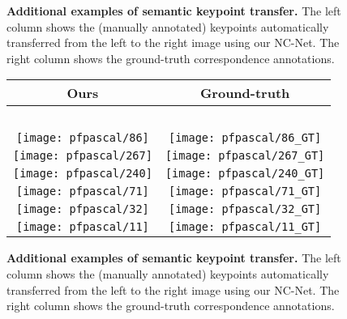\documentclass{article}
\begin{document}
\begin{figure}[tbp]
\begin{tabular}{@{\hskip 1pt}c@{\hskip 6pt}|@{\hskip 6pt}c@{\hskip 1pt}}
  \end{tabular}
  \endgroup
  \vspace{2pt}
  \caption{{\bf Additional examples of semantic  keypoint  transfer.} The left column shows the (manually annotated) keypoints automatically transferred from the left to the right image using our NC-Net. The right column shows the ground-truth correspondence annotations.}
  \label{fig:qualPascal}
\end{figure}\begin{figure}[tbp]
  \centering
  \begingroup
  \renewcommand{\arraystretch}{0.5}
  \begin{tabular}{@{\hskip 1pt}c@{\hskip 6pt}|@{\hskip 6pt}c@{\hskip 1pt}}
    Ours & Ground-truth \\ \hline
    ~ & ~ \\
\texttt{[image: pfpascal/86]}  & 
\texttt{[image: pfpascal/86\_GT]} \\
\texttt{[image: pfpascal/267]}  & 
\texttt{[image: pfpascal/267\_GT]} \\
\texttt{[image: pfpascal/240]}  & 
\texttt{[image: pfpascal/240\_GT]} \\
\texttt{[image: pfpascal/71]}  & 
\texttt{[image: pfpascal/71\_GT]} \\
\texttt{[image: pfpascal/32]}  & 
\texttt{[image: pfpascal/32\_GT]} \\
\texttt{[image: pfpascal/11]}  & 
\texttt{[image: pfpascal/11\_GT]} \\
  \end{tabular}
  \endgroup
  \vspace{2pt}
  \caption{{\bf Additional examples of semantic  keypoint  transfer.} The left column shows the (manually annotated) keypoints automatically transferred from the left to the right image using our NC-Net. The right column shows the ground-truth correspondence annotations.}
  \label{fig:qualPascal2}
\end{figure}%
\end{document}
